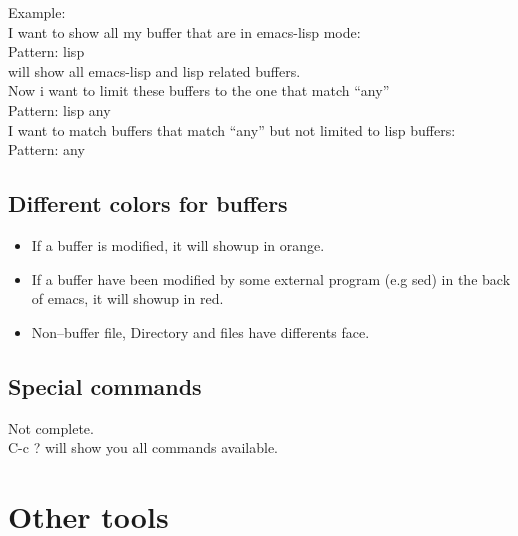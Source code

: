 \documentclass[a4paper,11pt]{article}
\begin{document}
Example:\\

I want to show all my buffer that are in emacs-lisp mode:\\

Pattern: lisp \\

will show all emacs-lisp and lisp related buffers.\\

Now i want to limit these buffers to the one that match ``any''\\

Pattern: lisp any \\
 
I want to match buffers that match ``any'' but not limited to lisp buffers:\\

Pattern: any \\

\subsection{Different colors for buffers}
\label{sec:diff-colors-buff}

\begin{itemize}
\item If a buffer is modified, it will showup in orange.
\end{itemize}
\begin{itemize}
\item If a buffer have been modified by some external program (e.g sed) in the back of emacs, it will showup in red.  
\end{itemize}
\begin{itemize}
\item Non--buffer file, Directory and files have differents face.
\end{itemize}

\subsection{Special commands}
\label{sec:special-commands}
Not complete.\\

C-c ? will show you all commands available.


\section{Other tools}
\label{sec:other-tools}
\end{document}
